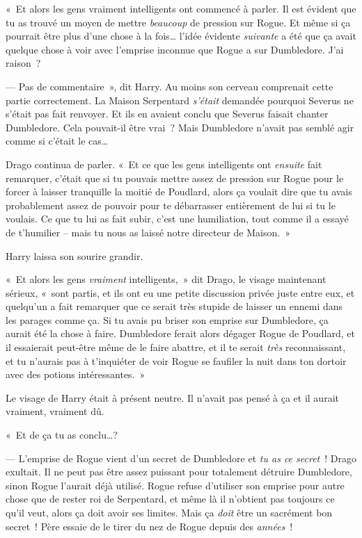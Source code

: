 «~Et alors les gens vraiment intelligents ont commencé à parler.
Il est évident que tu as trouvé un moyen de mettre \emph{beaucoup} de pression sur Rogue.
Et même si ça pourrait être plus d'une chose à la fois… l'idée évidente \emph{suivante} a été que ça avait quelque chose à voir avec l'emprise inconnue que Rogue a sur Dumbledore.
J'ai raison~?

--- Pas de commentaire~», dit Harry.
Au moins son cerveau comprenait cette partie correctement.
La Maison Serpentard \emph{s'était} demandée pourquoi Severus ne s'était pas fait renvoyer.
Et ils en avaient conclu que Severus faisait chanter Dumbledore.
Cela pouvait-il être vrai~?
Mais Dumbledore n'avait pas semblé agir comme si c'était le cas…

Drago continua de parler.
«~Et ce que les gens intelligents ont \emph{ensuite} fait remarquer, c'était que si tu pouvais mettre assez de pression sur Rogue pour le forcer à laisser tranquille la moitié de Poudlard, alors ça voulait dire que tu avais probablement assez de pouvoir pour te débarrasser entièrement de lui si tu le voulais.
Ce que tu lui as fait subir, c'est une humiliation, tout comme il a essayé de t'humilier -- mais tu nous as laissé notre directeur de Maison.~»

Harry laissa son sourire grandir.

«~Et alors les gens \emph{vraiment} intelligents,~» dit Drago, le visage maintenant sérieux, «~sont partis, et ils ont eu une petite discussion privée juste entre eux, et quelqu'un a fait remarquer que ce serait très stupide de laisser un ennemi dans les parages comme ça.
Si tu avais pu briser son emprise sur Dumbledore, ça aurait été la chose à faire.
Dumbledore ferait alors dégager Rogue de Poudlard, et il essaierait peut-être même de le faire abattre, et il te serait \emph{très} reconnaissant, et tu n'aurais pas à t'inquiéter de voir Rogue se faufiler la nuit dans ton dortoir avec des potions intéressantes.~»

Le visage de Harry était à présent neutre.
Il n'avait pas pensé à ça et il aurait vraiment, vraiment dû.

«~Et de ça tu as conclu…?

--- L'emprise de Rogue vient d'un secret de Dumbledore et \emph{tu as ce secret}~!
Drago exultait.
Il ne peut pas être assez puissant pour totalement détruire Dumbledore, sinon Rogue l'aurait déjà utilisé.
Rogue refuse d'utiliser son emprise pour autre chose que de rester roi de Serpentard, et même là il n'obtient pas toujours ce qu'il veut, alors ça doit avoir ses limites.
Mais ça \emph{doit} être un sacrément bon secret~!
Père essaie de le tirer du nez de Rogue depuis des \emph{années}~!

